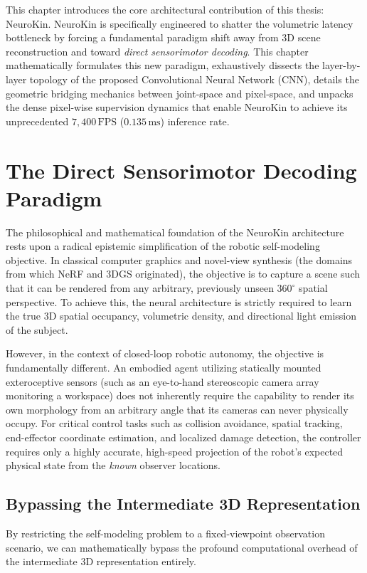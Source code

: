 \documentclass[12pt,a4paper,oneside]{report}
\begin{document}
This chapter introduces the core architectural contribution of this thesis: NeuroKin. NeuroKin is specifically engineered to shatter the volumetric latency bottleneck by forcing a fundamental paradigm shift away from 3D scene reconstruction and toward \textit{direct sensorimotor decoding}. This chapter mathematically formulates this new paradigm, exhaustively dissects the layer-by-layer topology of the proposed Convolutional Neural Network (CNN), details the geometric bridging mechanics between joint-space and pixel-space, and unpacks the dense pixel-wise supervision dynamics that enable NeuroKin to achieve its unprecedented $7{,}400\,\mathrm{FPS}$ ($0.135\,\mathrm{ms}$) inference rate.

\section{The Direct Sensorimotor Decoding Paradigm}

The philosophical and mathematical foundation of the NeuroKin architecture rests upon a radical epistemic simplification of the robotic self-modeling objective. In classical computer graphics and novel-view synthesis (the domains from which NeRF and 3DGS originated), the objective is to capture a scene such that it can be rendered from any arbitrary, previously unseen $360^\circ$ spatial perspective. To achieve this, the neural architecture is strictly required to learn the true 3D spatial occupancy, volumetric density, and directional light emission of the subject. 

However, in the context of closed-loop robotic autonomy, the objective is fundamentally different. An embodied agent utilizing statically mounted exteroceptive sensors (such as an eye-to-hand stereoscopic camera array monitoring a workspace) does not inherently require the capability to render its own morphology from an arbitrary angle that its cameras can never physically occupy. For critical control tasks such as collision avoidance, spatial tracking, end-effector coordinate estimation, and localized damage detection, the controller requires only a highly accurate, high-speed projection of the robot's expected physical state from the \textit{known} observer locations.

\subsection{Bypassing the Intermediate 3D Representation}

By restricting the self-modeling problem to a fixed-viewpoint observation scenario, we can mathematically bypass the profound computational overhead of the intermediate 3D representation entirely. 
\end{document}
